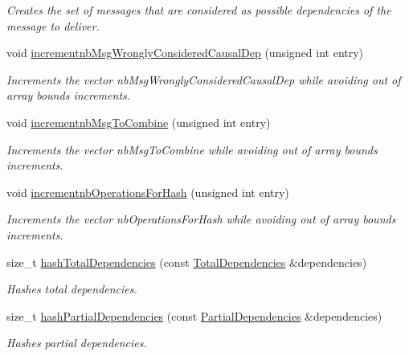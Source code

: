 \begin{DoxyCompactItemize}
\begin{DoxyCompactList}\small\item\em Creates the set of messages that are considered as possible dependencies of the message to deliver. \end{DoxyCompactList}\item 
void \hyperlink{class_hash_error_detector_a007d537bdfd329c6b23b432b58d4cf4c}{incrementnb\+Msg\+Wrongly\+Considered\+Causal\+Dep} (unsigned int entry)
\begin{DoxyCompactList}\small\item\em Increments the vector nb\+Msg\+Wrongly\+Considered\+Causal\+Dep while avoiding out of array bounds increments. \end{DoxyCompactList}\item 
void \hyperlink{class_hash_error_detector_a08b4518822a6beff6845da4dd36bfba1}{incrementnb\+Msg\+To\+Combine} (unsigned int entry)
\begin{DoxyCompactList}\small\item\em Increments the vector nb\+Msg\+To\+Combine while avoiding out of array bounds increments. \end{DoxyCompactList}\item 
void \hyperlink{class_hash_error_detector_a6aa56dfbb555e15093bd5d93a683fa42}{incrementnb\+Operations\+For\+Hash} (unsigned int entry)
\begin{DoxyCompactList}\small\item\em Increments the vector nb\+Operations\+For\+Hash while avoiding out of array bounds increments. \end{DoxyCompactList}\item 
size\+\_\+t \hyperlink{class_hash_error_detector_afcad668b4f0ca1c838b40a3c0584c1ee}{hash\+Total\+Dependencies} (const \hyperlink{class_total_dependencies}{Total\+Dependencies} \&dependencies)
\begin{DoxyCompactList}\small\item\em Hashes total dependencies. \end{DoxyCompactList}\item 
size\+\_\+t \hyperlink{class_hash_error_detector_aed8b0c6d17198a493e5b89f69c2e8713}{hash\+Partial\+Dependencies} (const \hyperlink{class_partial_dependencies}{Partial\+Dependencies} \&dependencies)
\begin{DoxyCompactList}\small\item\em Hashes partial dependencies. \end{DoxyCompactList}\item 

\end{DoxyCompactItemize}
